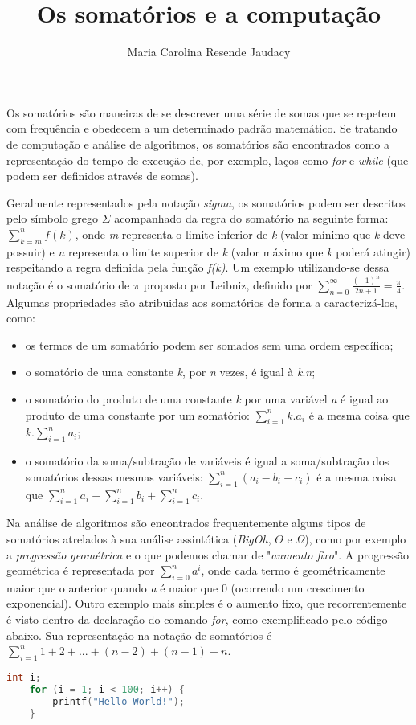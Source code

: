 \documentclass[12pt]{article}
\title{Os somatórios e a computação}
\author{Maria Carolina Resende Jaudacy\inst{1}}
\begin{document}
 

\maketitle

Os somatórios são maneiras de se descrever uma série de somas que se repetem com frequência e obedecem a um determinado padrão matemático. Se tratando de computação e análise de algoritmos, os somatórios são encontrados como a representação do tempo de execução de, por exemplo, laços como \textit{for} e \textit{while} (que podem ser definidos através de somas). 

Geralmente representados pela notação \textit{sigma}, os somatórios podem ser descritos pelo símbolo grego $\Sigma$ acompanhado da regra do somatório na seguinte forma: $\sum_{k=m}^{n} f(k)$, onde \textit{m} representa o limite inferior de \textit{k} (valor mínimo que \textit{k} deve possuir) e \textit{n} representa o limite superior de \textit{k} (valor máximo que \textit{k} poderá atingir) respeitando a regra definida pela função \textit{f(k)}. Um exemplo utilizando-se dessa notação é o somatório de $\pi$ proposto por Leibniz, definido por $\sum_{n=0}^{\infty} \frac{(-1)^{n}}{2n+1} = \frac{\pi}{4}$. Algumas propriedades são atribuidas aos somatórios de forma a caracterizá-los, como:

\begin{itemize}
    \item{os termos de um somatório podem ser somados sem uma ordem específica;}
    \item{o somatório de uma constante \textit{k}, por \textit{n} vezes, é igual à \textit{k}.\textit{n};}
    \item{o somatório do produto de uma constante \textit{k} por uma variável \textit{a} é igual ao produto de uma constante por um somatório: $\sum_{i=1}^{n} k.a_i$ é a mesma coisa que $k.\sum_{i=1}^{n} a_i$;}
    \item{o somatório da soma/subtração de variáveis é igual a soma/subtração dos somatórios dessas mesmas variáveis: $\sum_{i=1}^{n} (a_i - b_i + c_i)$ é a mesma coisa que $\sum_{i=1}^{n} a_i - \sum_{i=1}^{n} b_i + \sum_{i=1}^{n} c_i$.}
\end{itemize}

Na análise de algoritmos são encontrados frequentemente alguns tipos de somatórios atrelados à sua análise assintótica (\textit{BigOh}, $\Theta$ e $\Omega$), como por exemplo a \textit{progressão geométrica} e o que podemos chamar de "\textit{aumento fixo}". A progressão geométrica é representada por $\sum_{i=0}^{n} a^i$, onde cada termo é geométricamente maior que o anterior quando \textit{a} é maior que 0 (ocorrendo um crescimento exponencial). Outro exemplo mais simples é o aumento fixo, que recorrentemente é visto dentro da declaração do comando \textit{for}, como exemplificado pelo código abaixo. Sua representação na notação de somatórios é $\sum_{i=1}^{n} 1+2+...+(n-2)+(n-1)+n$.
\begin{lstlisting}[language=c]
    int i;
    for (i = 1; i < 100; i++) {
        printf("Hello World!");
    }
\end{lstlisting}
\end{document}
